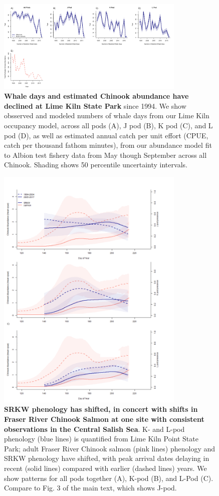\documentclass{article}
\begin{document}
\begin{figure}[p]
\includegraphics[width=0.8\textwidth]{../analyses/orcaphen/figures/modwhaledays_lime.png} 
\caption{\textbf{Whale days and estimated Chinook abundance have declined at Lime Kiln State Park} since 1994. We show obsserved and modeled numbers of whale days from our Lime Kiln occupancy model, across all pods (A), J pod (B), K pod (C), and L pod (D), as well as estimated annual catch per unit effort (CPUE, catch per thousand fathom minutes), from our abundance model fit to Albion test fishery data from May though September across all Chinook. Shading shows 50 percentile uncertainty intervals.}
\label{fig:mlimewdays}
\end{figure}
\newpage
\begin{figure}[p]
\includegraphics[width=0.8\textwidth]{../analyses/orcaphen/figures/orcachinphenoverlapKL2005.png}
\caption{\textbf{SRKW phenology has shifted, in concert with shifts in Fraser River Chinook Salmon at one site with consistent observations in the Central Salish Sea}. K- and L-pod phenology (blue lines) is quantified from Lime Kiln Point State Park; adult Fraser River Chinook salmon (pink lines) phenology and SRKW phenology have shifted, with peak arrival dates delaying in recent (solid lines) compared with earlier (dashed lines) years. We show patterns for all pods together (A), K-pod (B), and L-Pod (C). Compare to Fig. 3 of the main text, which shows J-pod. }
\label{fig:KLchin}
\end{figure}
\end{document}
